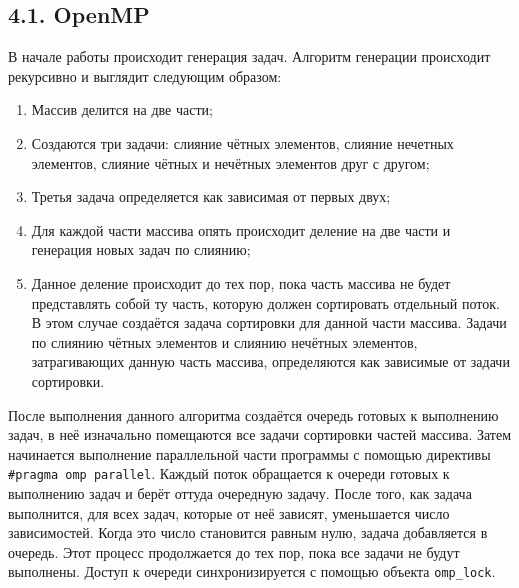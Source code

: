 \documentclass{report}
\begin{document}
    \subsection*{4.1. OpenMP}
    \par В начале работы происходит генерация задач. Алгоритм генерации происходит рекурсивно и выглядит следующим образом: 
    \begin{enumerate}
        \item Массив делится на две части;
        \item Создаются три задачи: слияние чётных элементов, слияние нечетных элементов, слияние чётных и нечётных элементов друг с другом;
        \item Третья задача определяется как зависимая от первых двух;
        \item Для каждой части массива опять происходит деление на две части и генерация новых задач по слиянию;
        \item Данное деление происходит до тех пор, пока часть массива не будет представлять собой ту часть, которую должен сортировать отдельный поток. В этом случае создаётся задача сортировки для данной части массива. Задачи по слиянию чётных элементов и слиянию нечётных элементов, затрагивающих данную часть массива, определяются как зависимые от задачи сортировки.
    \end{enumerate}
    \par После выполнения данного алгоритма создаётся очередь готовых к выполнению задач, в неё изначально помещаются все задачи сортировки частей массива. Затем начинается выполнение параллельной части программы с помощью директивы \verb|#pragma omp parallel|. Каждый поток обращается к очереди готовых к выполнению задач и берёт оттуда очередную задачу. После того, как задача выполнится, для всех задач, которые от неё зависят, уменьшается число зависимостей. Когда это число становится равным нулю, задача добавляется в очередь. Этот процесс продолжается до тех пор, пока все задачи не будут выполнены. Доступ к очереди синхронизируется с помощью объекта \verb|omp_lock|.
    
\end{document}
